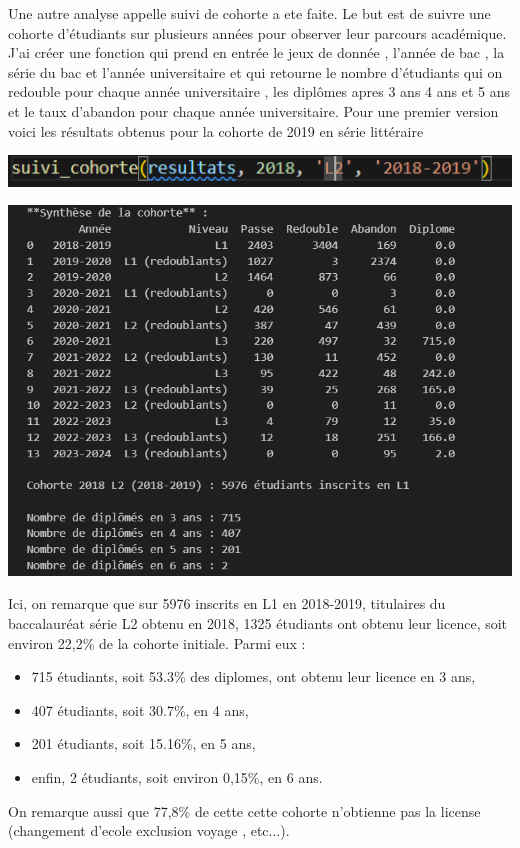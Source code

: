 Une autre analyse appelle suivi de cohorte a ete faite. Le but est de suivre une cohorte d'étudiants sur plusieurs années pour observer leur parcours académique. J'ai créer une fonction qui prend en entrée le jeux de donnée , l'année de bac , la série du bac et l'année universitaire
et qui retourne le nombre d'étudiants qui on redouble pour chaque année universitaire , les diplômes  apres 3 ans 4 ans et 5 ans et le taux d'abandon pour chaque année universitaire. 
Pour une premier version voici les résultats obtenus pour la cohorte de 2019 en série littéraire 
\begin{center}
    \includegraphics[width=1\textwidth]{image/10.png} 
\end{center} 
\begin{center}
    \includegraphics[width=1\textwidth]{image/11.png} 
\end{center} 
Ici, on remarque que sur 5976 inscrits en L1 en 2018-2019, titulaires du baccalauréat série L2 obtenu en 2018, 1325 étudiants ont obtenu leur licence, soit environ 22,2\% de la cohorte initiale.
Parmi eux :
\begin{itemize}
    \item 715 étudiants, soit 53.3\% des diplomes, ont obtenu leur licence en 3 ans,
    \item 407 étudiants, soit 30.7\%, en 4 ans,
    \item 201 étudiants, soit 15.16\%, en 5 ans,
    \item enfin, 2 étudiants, soit environ 0,15\%, en 6 ans.
\end{itemize} 
On remarque  aussi que 77,8\% de cette  cette cohorte n'obtienne pas la license (changement d'ecole  exclusion  voyage , etc...). 

